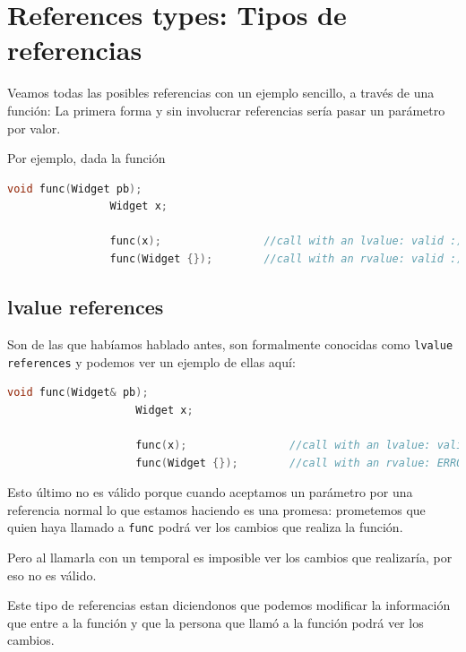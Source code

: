 \documentclass[12pt, fleqn]{report}                             %
\theoremstyle{break}                                            %
\newcommand{\textCode}[1]  { \texttt{#1} }                      %
\begin{document}
        \section{References types: Tipos de referencias}

            Veamos todas las posibles referencias con un ejemplo sencillo, a través de una función:
            La primera forma y sin involucrar referencias sería pasar un parámetro por valor.

            Por ejemplo, dada la función
            \begin{lstlisting}[language=C++, gobble=16]
                void func(Widget pb);
                Widget x;

                func(x);                //call with an lvalue: valid :)
                func(Widget {});        //call with an rvalue: valid :)
            \end{lstlisting}

            \subsection{lvalue references} 

                Son de las que habíamos hablado antes, son formalmente conocidas como 
                \textCode{lvalue references} y podemos ver un ejemplo de ellas aquí:
                \begin{lstlisting}[language=C++, gobble=20]
                    void func(Widget& pb);
                    Widget x;

                    func(x);                //call with an lvalue: valid :)
                    func(Widget {});        //call with an rvalue: ERROR :(
                \end{lstlisting}

                Esto último no es válido porque cuando aceptamos un parámetro por una referencia normal
                lo que estamos haciendo es una promesa: prometemos que quien haya llamado a 
                \textCode{func} podrá ver los cambios que realiza la función.

                Pero al llamarla con un temporal es imposible ver los cambios que realizaría, 
                por eso no es válido.

                Este tipo de referencias estan diciendonos que podemos modificar la información
                que entre a la función y que la persona que llamó a la función podrá ver los cambios.
            
\end{document}
